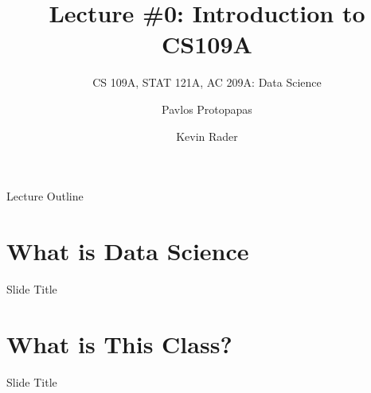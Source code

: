 \documentclass[12pt,t]{beamer}
\begin{document}

\title{\large{Lecture \#0: Introduction to CS109A}}
\subtitle{CS 109A, STAT 121A, AC 209A: Data Science}
\author{Pavlos Protopapas \and Kevin Rader}
\date{}
{
\frame{
  \titlepage
  
}
}


\begin{frame}{Lecture Outline}
\tableofcontents
\end{frame}

\section{What is Data Science}

\begin{frame}{Slide Title} 

\end{frame}

\section{What is This Class?}

\begin{frame}{Slide Title} 

\end{frame}
\end{document}

